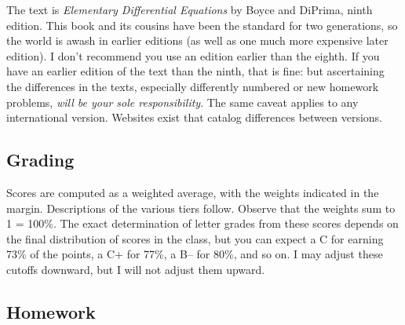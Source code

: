 \documentclass[symmetric]{tufte-handout}
\begin{document}
The text is \emph{Elementary Differential Equations} by Boyce
and DiPrima, ninth edition. This book and its cousins have been the standard
for two generations, so the world is awash in earlier editions (as well as
one much more expensive later edition). I don't recommend you use an edition
earlier than the eighth. If you have an earlier edition of the text than the
ninth, that is fine: but ascertaining the differences in the texts,
especially differently numbered or new homework problems, \emph{will be your
sole responsibility}. The same caveat applies to any international version.
Websites exist that catalog differences between versions.

\subsection{Grading}

Scores%
are computed as a weighted average, with the weights indicated in the
margin. Descriptions of the various tiers follow. 
Observe that the weights sum to 1 = 100\%. The exact determination of letter
grades from these scores depends on the final distribution of scores in the
class, but you can expect a C for earning 73\% of the points, a C+ for
77\%, a B– for 80\%, and so on. I may adjust these cutoffs downward, but
I will not adjust them upward.

\subsection{Homework}
\end{document}
